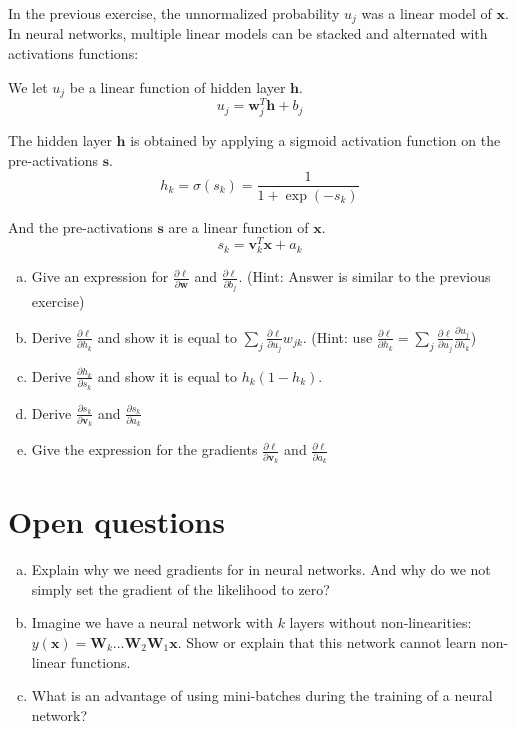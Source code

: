\documentclass[11pt,a4paper]{article}
\newcommand{\xb}{\mathbf{x}}
\newcommand{\vb}{\mathbf{v}}
\newcommand{\wb}{\mathbf{w}}
\newcommand{\hb}{\mathbf{h}}
\newcommand{\sbold}{\mathbf{s}}
\newcommand{\Wb}{\mathbf{W}}
\begin{document}
\noindent In the previous exercise, the unnormalized probability $u_j$ was a linear model of $\xb$. In neural networks, multiple linear models can be stacked and alternated with activations functions:

We let $u_j$ be a linear function of hidden layer $\hb$.
\[ u_j = \wb_j^T \hb + b_j \]

\noindent The hidden layer $\hb$ is obtained by applying a sigmoid activation function on the pre-activations $\sbold$.
\[ h_k = \sigma(s_k) = \frac{1}{1 + \exp(-s_k)} \]

And the pre-activations $\sbold$ are a linear function of $\xb$.
\[ s_k = \vb_k^T \xb + a_k \]



\begin{enumerate}[(a)]
\item Give an expression for $\frac{\partial \ell}{\partial \wb}$ and $\frac{\partial \ell}{\partial b_j}$. (Hint: Answer is similar to the previous exercise)
\item Derive $\frac{\partial \ell}{\partial h_k}$ and show it is equal to $\sum_j \frac{\partial \ell}{\partial u_j} w_{jk}$. (Hint: use $\frac{\partial \ell}{\partial h_k} = \sum_j \frac{\partial \ell}{\partial u_j}\frac{\partial u_j}{\partial h_k}$)
\item Derive $\frac{\partial h_k}{\partial s_k}$ and show it is equal to $h_k (1 - h_k)$.
\item Derive $\frac{\partial s_k}{\partial \vb_k}$ and $\frac{\partial s_k}{\partial a_k}$
\item Give the expression for the gradients $\frac{\partial \ell}{\partial \vb_k}$ and $\frac{\partial \ell}{\partial a_k}$
\end{enumerate}



\section{Open questions}
\begin{enumerate}[(a)]
\item Explain why we need gradients for in neural networks. And why do we not simply set the gradient of the likelihood to zero? 

\item Imagine we have a neural network with $k$ layers without non-linearities: $y(\xb) = \Wb_k \ldots \Wb_2 \Wb_1 \xb $. Show or explain that this network cannot learn non-linear functions. 

\item What is an advantage of using mini-batches during the training of a neural network?
\end{enumerate}
\end{document}
